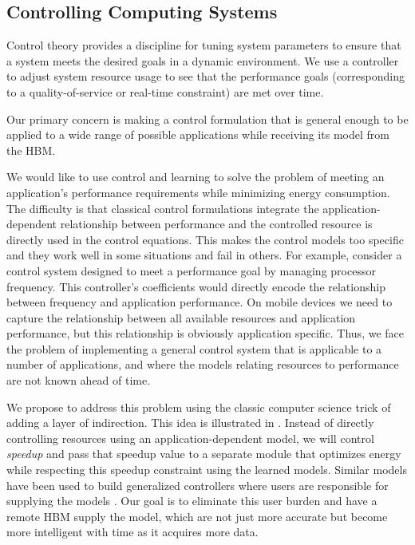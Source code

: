 
\subsection{Controlling Computing Systems}

Control theory provides a discipline for tuning system parameters to ensure
that a system meets the desired goals in a dynamic environment.  We use a controller to  adjust system resource usage to see that the performance goals (corresponding to a quality-of-service or real-time constraint) are met over time.  

Our primary concern is making a
control formulation that is general enough to be applied to a wide
range of possible applications while receiving its model from the HBM.

We would like to use control and learning to solve the problem of
meeting an application's performance requirements while minimizing
energy consumption.  The difficulty is that classical control
formulations integrate the application-dependent relationship between performance and the
controlled resource is directly used in the control equations. This makes the control models too specific and they work well in some situations and fail in others.  For
example, consider a control system designed to meet a performance goal
by managing processor frequency.  This controller's coefficients would
directly encode the relationship between frequency and application
performance. On mobile devices we need to capture the relationship
between all available resources and application performance, but this
relationship is obviously application specific.  Thus, we face the
problem of implementing a general control system that is applicable to
a number of applications, and where the models relating resources to
performance are not known ahead of time.

We propose to address this problem using the classic computer science
trick of adding a layer of indirection.  This idea is illustrated in
.  Instead of directly controlling resources using an
application-dependent model, we will control \emph{speedup} and pass
that speedup value to a separate module that optimizes energy while
respecting this speedup constraint using the learned models.  Similar
models have been used to build generalized controllers where users are
responsible for supplying the models \cite{POET}.  Our goal is to
eliminate this user burden and have a remote HBM supply the model, which are not just more accurate but become more intelligent with time as it acquires more data.

